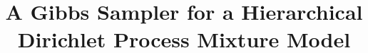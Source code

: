 \title{A Gibbs Sampler for a \mbox{Hierarchical} \mbox{Dirichlet} \mbox{Process} \mbox{Mixture} \mbox{Model}}
